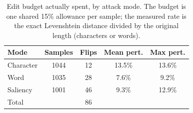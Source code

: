 \begin{table}[t]
\centering
\small
\caption{Edit budget actually spent, by attack mode. The budget is one shared 15\% allowance per sample; the measured rate is the exact Levenshtein distance divided by the original length (characters or words).}
\label{tab:budget}
\begin{tabular}{lcccc}
\toprule
\textbf{Mode} & \textbf{Samples} & \textbf{Flips} & \textbf{Mean pert.} & \textbf{Max pert.} \\
\midrule
 Character & 1044 & 12 & 13.5\% & 13.6\% \\
 Word & 1035 & 28 & 7.6\% & 9.2\% \\
 Saliency & 1001 & 46 & 9.3\% & 12.9\% \\
\midrule
\multicolumn{2}{l}{Total} & 86 & & \\
\bottomrule
\end{tabular}
\end{table}
